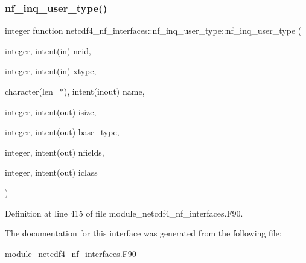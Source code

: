 \subsubsection{\texorpdfstring{nf\+\_\+inq\+\_\+user\+\_\+type()}{nf\_inq\_user\_type()}}
{\footnotesize\ttfamily integer function netcdf4\+\_\+nf\+\_\+interfaces\+::nf\+\_\+inq\+\_\+user\+\_\+type\+::nf\+\_\+inq\+\_\+user\+\_\+type (\begin{DoxyParamCaption}\item[{integer, intent(in)}]{ncid,  }\item[{integer, intent(in)}]{xtype,  }\item[{character(len=$\ast$), intent(inout)}]{name,  }\item[{integer, intent(out)}]{isize,  }\item[{integer, intent(out)}]{base\+\_\+type,  }\item[{integer, intent(out)}]{nfields,  }\item[{integer, intent(out)}]{iclass }\end{DoxyParamCaption})}



Definition at line 415 of file module\+\_\+netcdf4\+\_\+nf\+\_\+interfaces.\+F90.



The documentation for this interface was generated from the following file\+:\begin{DoxyCompactItemize}
\item 
\hyperlink{module__netcdf4__nf__interfaces_8F90}{module\+\_\+netcdf4\+\_\+nf\+\_\+interfaces.\+F90}\end{DoxyCompactItemize}
